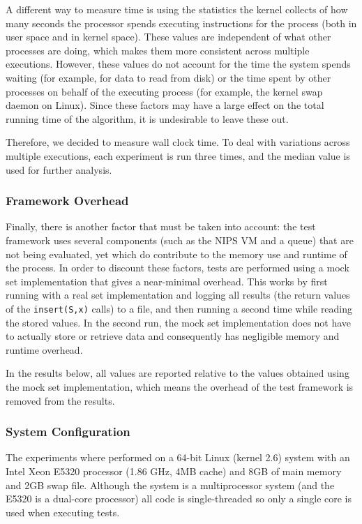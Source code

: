 \documentclass{acm_proc_article-sp}
\begin{document}
A different way to measure time is using the statistics the kernel collects
of how many seconds the processor spends executing instructions for the process
(both in user space and in kernel space). These values are independent of
what other processes are doing, which makes them more consistent across
multiple executions. However, these values do not account for the time the
system spends waiting (for example, for data to read from disk)
or the time spent by other processes on behalf of the executing process
(for example, the kernel swap daemon on Linux). Since these factors may have
a large effect on the total running time of the algorithm, it is undesirable
to leave these out.

Therefore, we decided to measure wall clock time. To deal with variations
across multiple executions, each experiment is run three times, and the median
value is used for further analysis.

\subsubsection{Framework Overhead}
Finally, there is another factor that must be taken into account: the test
framework uses several components (such as the NIPS VM and a queue) that are
not being evaluated, yet which do contribute to the memory use and runtime
of the process. In order to discount these factors, tests are performed using
a mock set implementation that gives a near-minimal overhead. This works
by first running with a real set implementation and logging all results
(the return values of the \verb#insert(S,x)# calls) to a file, and then
running a second time while reading the stored values. In the second run,
the mock set implementation does not have to actually store or retrieve
data and consequently has negligible memory and runtime overhead.

In the results below, all values are reported relative to the values obtained
using the mock set implementation, which means the overhead of the test
framework is removed from the results.

\subsubsection{System Configuration}
The experiments where performed on a 64-bit Linux (kernel 2.6) system
with an Intel Xeon E5320 processor (1.86 GHz, 4MB cache) and 8GB of main
memory and 2GB swap file. Although the system is a multiprocessor system
(and the E5320 is a dual-core processor) all code is single-threaded so
only a single core is used when executing tests.
\end{document}
